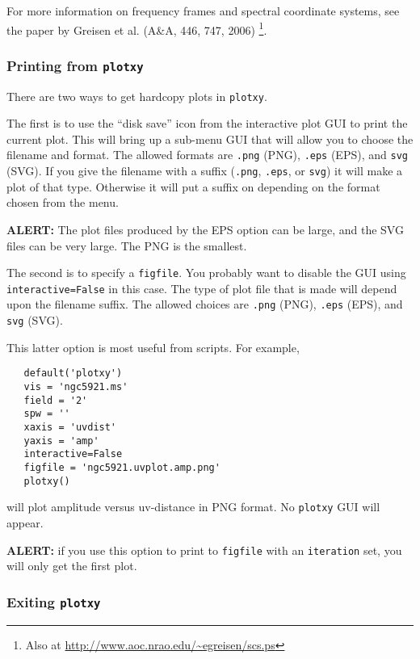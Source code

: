 For more information on frequency frames and spectral coordinate
systems, see the paper by Greisen et al. (A\&A, 446, 747, 2006)
\footnote{Also at \url{http://www.aoc.nrao.edu/~egreisen/scs.ps}}.

\subsubsection{Printing from {\tt plotxy}}
\label{section:edit.plot.plotxy.print}

There are two ways to get hardcopy plots in {\tt plotxy}.  

The first is to use the ``disk save'' icon from the interactive plot GUI to 
print the current plot.  This will bring up a sub-menu GUI that will
allow you to choose the filename and format.  The allowed formats are {\tt .png} (PNG), 
{\tt .eps} (EPS), and {\tt svg} (SVG).  If you give the filename with
a suffix ({\tt .png}, {\tt .eps}, or {\tt svg}) it will make a plot of
that type.  Otherwise it will put a suffix on depending on the format
chosen from the menu.

{\bf ALERT:} The plot files produced by the EPS option can be
large, and the SVG files can be very large.  The PNG is the smallest.

The second is to specify a {\tt figfile}.  You probably want to disable the
GUI using {\tt interactive=False} in this case.  The type of plot file
that is made will depend upon the filename suffix.  The allowed
choices are {\tt .png} (PNG), {\tt .eps} (EPS), and {\tt svg} (SVG).

This latter option is most useful from scripts.  For example,
\small
\begin{verbatim}
   default('plotxy')
   vis = 'ngc5921.ms'
   field = '2'
   spw = ''
   xaxis = 'uvdist'
   yaxis = 'amp'
   interactive=False
   figfile = 'ngc5921.uvplot.amp.png'
   plotxy()
\end{verbatim}
\normalsize
will plot amplitude versus uv-distance in PNG format.  No {\tt plotxy}
GUI will appear.

{\bf ALERT:} if
you use this option to print to {\tt figfile} with an {\tt iteration}
set, you will only get the first plot.

\subsubsection{Exiting {\tt plotxy}}
\label{section:edit.plot.plotxy.exit}

